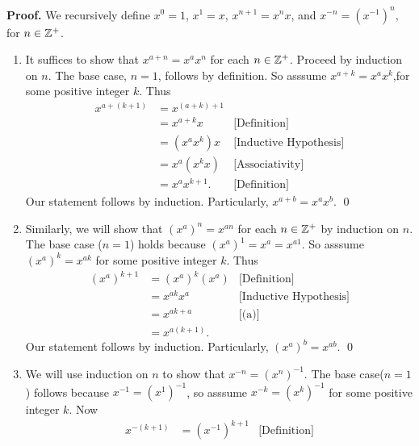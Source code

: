\begin{enumerate}
      \textbf{Proof.} We recursively define $x^0 = 1$, $x^1 = x$,
      $x^{n+1} = x^nx$, and $x^{-n} = (x^{-1})^n$, for $n \in \mathbb{Z}^+$.
      
      \begin{enumerate}
         \item It suffices to show that $x^{a+n} = x^ax^n$ for each
               $n \in \mathbb{Z}^+$. Proceed by induction on $n$. The base case,
               $n = 1$, follows by definition. So asssume $x^{a+k} = x^ax^k$,for 
               some positive integer $k$. Thus
               \begin{align*}
                  x^{a+(k+1)} &= x^{(a+k)+1} \\
                          &= x^{a+k}x &\text{[Definition]} \\
                          &= (x^ax^k)x &\text{[Inductive Hypothesis]} \\
                          &= x^a(x^kx) &\text{[Associativity]}\\
                          &= x^ax^{k+1}. &\text{[Definition]}
               \end{align*}
               Our statement follows by induction. Particularly,
               $x^{a+b} = x^ax^b$. \qed
         \item Similarly, we will show that $(x^a)^n = x^{an}$ for each
               $n \in \mathbb{Z}^+$ by induction on $n$. The base case ($n=1$) holds
               because $(x^a)^1 = x^a = x^{a1}$. So asssume
               $(x^a)^k = x^{ak}$ for some positive integer $k$. Thus
               \begin{align*}
                  (x^a)^{k+1} &= (x^a)^k(x^a) &\text{[Definition]} \\
                          &= x^{ak}x^a &\text{[Inductive Hypothesis]} \\
                          &= x^{ak+a} &\text{[(a)]} \\
                          &= x^{a(k+1)}.
               \end{align*} 
               Our statement follows by induction. Particularly,
               $(x^a)^b = x^{ab}$. \qed
         \item We will use induction on $n$ to show that $x^{-n} = (x^n)^{-1}$.
               The base case($n = 1$) follows because $x^{-1} = (x^1)^{-1}$, so
               asssume $x^{-k} = (x^k)^{-1}$ for some positive integer $k$. Now
               \begin{align*}
                  x^{-(k+1)} &= (x^{-1})^{k+1} &\text{[Definition]} \\

\end{align*}
\end{enumerate}
\end{enumerate}
